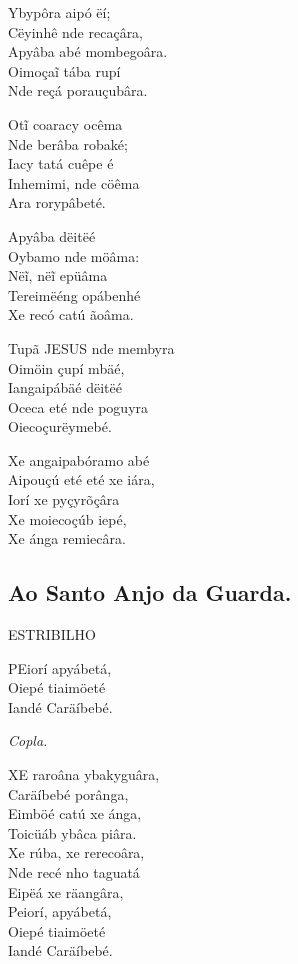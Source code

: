\documentclass[openany,titlepage,12pt]{book}
\begin{document}
Ybypôra aipó ëí;\\
Cëyinhê nde recaçâra,\\
Apyâba abé mombegoâra.\\
Oimoçaĩ tába rupí\\
Nde reçá porauçubâra.

Otĩ coaracy ocêma\\
Nde berâba robaké;\\
Iacy tatá cuêpe é\\
Inhemimi, nde cöêma\\
Ara rorypâbeté.

Apyâba dëitëé\\
Oybamo nde möâma:\\
Nëĩ, nëĩ epüâma\\
Tereimëéng opábenhé\\
Xe recó catú ãoâma.

Tupã JESUS nde membyra\\
Oimöin çupí mbäé,\\
Iangaipábäé dëitëé\\
Oceca eté nde poguyra\\
Oiecoçurëymebé.

Xe angaipabóramo abé\\
Aipouçú eté eté xe iára,\\
Iorí xe pyçyrõçâra\\
Xe moiecoçúb iepé,\\
Xe ánga remiecâra.\\%
\newpage

\subsection{Ao Santo Anjo da Guarda.}
\begin{center} 
    ESTRIBILHO
\end{center}
\unskip
\vspace{\baselineskip}
\lettrine[findent =4pt, nindent=0pt, lines=2]
{P}{E}iorí apyábetá,\\
Oiepé tiaimöeté\\
Iandé Caräíbebé.

\begin{center}
    \textit{Copla.}
\end{center}

\lettrine[findent =4pt, nindent=0pt, lines=2]
{X}{E} raroâna ybakyguâra,\\
Caräíbebé porânga,\\
Eimböé catú xe ánga,\\
Toicüáb ybâca piâra.\\
Xe rúba, xe rerecoâra,\\
Nde recé nho taguatá\\
Eipëá xe räangâra,\\
Peiorí, apyábetá,\\
Oiepé tiaimöeté\\
Iandé Caräíbebé.
\end{document}

